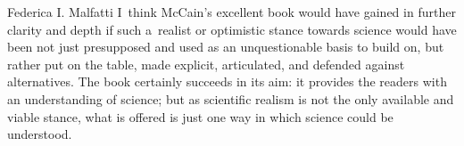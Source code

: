 \begin{recengenv}{Federica I. Malfatti}
I~think McCain's excellent book would have gained in further clarity and depth if such a~realist or optimistic stance towards science would have been not just presupposed and used as an unquestionable basis to build on, but rather put on the table, made explicit, articulated, and defended against alternatives. The book certainly succeeds in its aim: it provides the readers with an understanding of science; but as scientific realism is not the only available and viable stance, what is offered is just one way in which science could be understood.



\end{recengenv}
